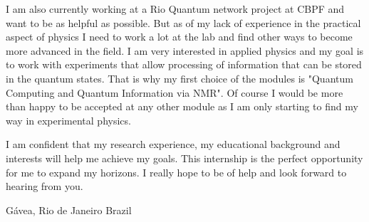 \documentclass[11pt,a4paper,sans]{moderncv}        %
\begin{document}
	I am also currently working at a Rio Quantum network project at CBPF and want to be as helpful as possible. But as of my lack of experience in the practical aspect of physics I need to work a lot at the lab and find other ways to become more advanced in the field. I am very interested in applied physics and my goal is to work with experiments that allow processing of information that can be stored in the quantum states. That is why my first choice of the modules is "Quantum Computing and Quantum Information via NMR". Of course I would be more than happy to be accepted at any other module as I am only starting to find my way in experimental physics.
	
	I am confident that my research experience, my educational background and interests will help me achieve my goals. This internship is the perfect opportunity for me to expand my horizons. I really hope to be of help and look forward to hearing from you.
	
	\vspace*{\fill}
	\title{}
	\address{Av. Padre Leonel Franca, 261}{Gávea, Rio de Janeiro}{ Brazil }
	\makeletterclosing
	\name{}{}
\end{document}
